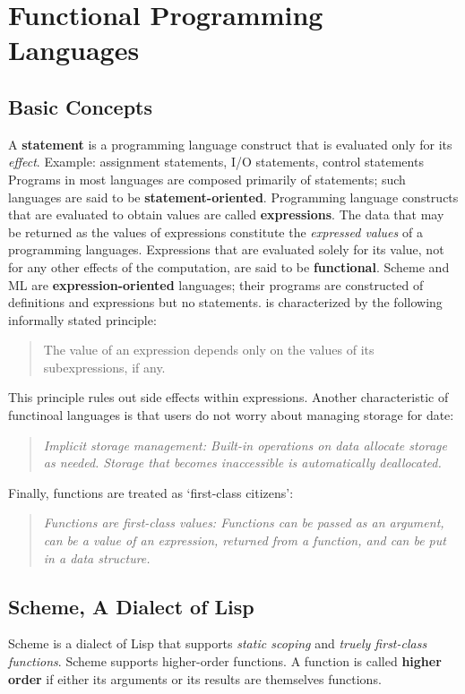 \documentclass{article}
\begin{document}
\section{Functional Programming Languages}
\subsection{Basic Concepts}
\bit
\w A {\bf{}statement} is a programming language construct that
	is evaluated only for its {\em{}effect\/}.
	\bit
	\w Example: assignment statements, I/O statements, 
		control statements
	\w Programs in most languages are composed primarily 
		of statements; such languages are said to be 
		{\bf{}statement-oriented}.
	\eit
\w Programming language constructs that are evaluated to 
	obtain values are called {\bf{}expressions}.
	\bit
	\w The data that may be returned as the values of expressions
		constitute the {\em{}expressed values} of a 
		programming languages.
	\w Expressions that are evaluated solely for its value,
		not for any other effects of the computation,
		are said to be {\bf{}functional}.
	\w Scheme and ML are {\bf{}expression-oriented} languages;
		their programs are constructed of definitions and
		expressions but no statements.
	\eit
{} is characterized by the following
	informally stated principle:
	\begin{quote}
	The value of an expression depends only on the values of its 
	subexpressions, if any.
	\end{quote}
	\bit
	\w This principle rules out side effects within expressions.
	\eit
\w Another characteristic of functinoal languages is that users
	do not worry about managing storage for date:
	\begin{quote}
	{\em{}Implicit storage management: Built-in operations on data
		allocate storage as needed. Storage that becomes
		inaccessible is automatically deallocated.}
	\end{quote}
\w Finally, functions are treated as `first-class citizens':
	\begin{quote}
	{\em{}Functions are first-class values: Functions can be passed
	as an argument, can be a value of an expression, returned from
	a function, and can be put in a data structure.}
	\end{quote}
\eit

\subsection{Scheme, A Dialect of Lisp}
\bit
\w Scheme is a dialect of Lisp that supports {\em{}static scoping\/}
	and {\em{}truely first-class functions\/}.
\w Scheme supports higher-order functions.
	\bit
	\w A function is called {\bf{}higher order} if either its 
		arguments or its results are themselves functions.
	\eit
\eit
\end{document}
